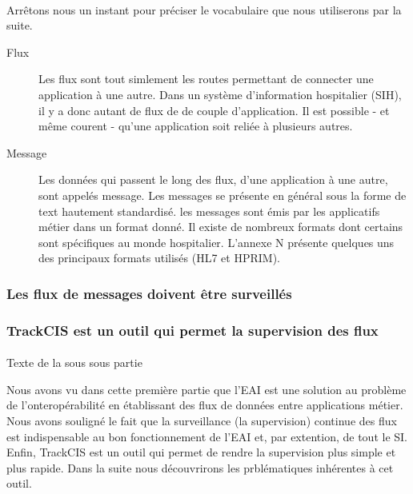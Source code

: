 			\paragraph{}%
 			Arrêtons nous un instant pour préciser le vocabulaire que nous utiliserons
 			par la suite.\newline
 			\begin{description}
 				\item[Flux] Les flux sont tout simlement les routes permettant de connecter
 				une application à une autre. Dans un système d'information hospitalier
 				(SIH), il y a donc autant de flux de de couple d'application. Il est
 				possible - et même courent - qu'une application soit reliée à plusieurs
 				autres.
 				\item[Message] Les données qui passent le long des flux, d'une application
 				à une autre, sont appelés message. Les messages se présente en général sous
 				la forme de text hautement standardisé. les messages sont émis par les
 				applicatifs métier dans un format donné. Il existe de nombreux formats
 				dont certains sont spécifiques au monde hospitalier. L'annexe N présente
 				quelques uns des principaux formats utilisés (HL7 et HPRIM).
 			\end{description}
 			
		\subsubsection{Les flux de messages doivent être surveillés}
			\paragraph{}
			
			
		\subsubsection{TrackCIS est un outil qui permet la supervision des flux}
			\paragraph{}
			Texte de la sous sous partie
		
		Nous avons vu dans cette première partie que l'EAI est une solution au
		problème de l'onteropérabilité en établissant des flux de données entre
		applications métier. Nous avons souligné le fait que la surveillance (la
		supervision) continue des flux est indispensable au bon fonctionnement de
		l'EAI et, par extention, de tout le SI. Enfin, TrackCIS est un outil qui permet de rendre la
		supervision plus simple et plus rapide.\newline
		Dans la suite nous découvrirons les prblématiques inhérentes à cet outil.
		
